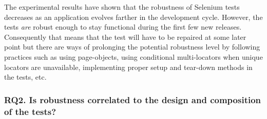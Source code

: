 The experimental results have shown that the robustness of Selenium tests decreases as an application evolves farther in the development cycle. However, the tests \textit{are} robust enough to stay functional during the first few new releases. Consequently that means that the test will have to be repaired at some later point but there are ways of prolonging the potential robustness level by following practices such as using page-objects, using conditional multi-locators  when unique locators are unavailable, implementing proper setup and tear-down methods in the tests, etc. 



\subsubsection*{RQ2. Is robustness correlated to the design and composition of the tests?}
%  

